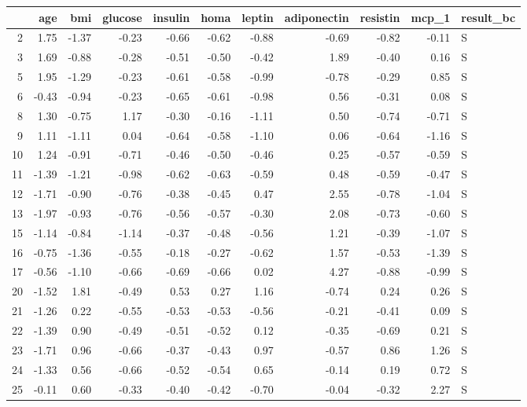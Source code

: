 \begin{table}[ht]
\centering
\begin{tabular}{rrrrrrrrrrl}
  \hline
 & age & bmi & glucose & insulin & homa & leptin & adiponectin & resistin & mcp\_1 & result\_bc \\ 
  \hline
2 & 1.75 & -1.37 & -0.23 & -0.66 & -0.62 & -0.88 & -0.69 & -0.82 & -0.11 & S \\ 
  3 & 1.69 & -0.88 & -0.28 & -0.51 & -0.50 & -0.42 & 1.89 & -0.40 & 0.16 & S \\ 
  5 & 1.95 & -1.29 & -0.23 & -0.61 & -0.58 & -0.99 & -0.78 & -0.29 & 0.85 & S \\ 
  6 & -0.43 & -0.94 & -0.23 & -0.65 & -0.61 & -0.98 & 0.56 & -0.31 & 0.08 & S \\ 
  8 & 1.30 & -0.75 & 1.17 & -0.30 & -0.16 & -1.11 & 0.50 & -0.74 & -0.71 & S \\ 
  9 & 1.11 & -1.11 & 0.04 & -0.64 & -0.58 & -1.10 & 0.06 & -0.64 & -1.16 & S \\ 
  10 & 1.24 & -0.91 & -0.71 & -0.46 & -0.50 & -0.46 & 0.25 & -0.57 & -0.59 & S \\ 
  11 & -1.39 & -1.21 & -0.98 & -0.62 & -0.63 & -0.59 & 0.48 & -0.59 & -0.47 & S \\ 
  12 & -1.71 & -0.90 & -0.76 & -0.38 & -0.45 & 0.47 & 2.55 & -0.78 & -1.04 & S \\ 
  13 & -1.97 & -0.93 & -0.76 & -0.56 & -0.57 & -0.30 & 2.08 & -0.73 & -0.60 & S \\ 
  15 & -1.14 & -0.84 & -1.14 & -0.37 & -0.48 & -0.56 & 1.21 & -0.39 & -1.07 & S \\ 
  16 & -0.75 & -1.36 & -0.55 & -0.18 & -0.27 & -0.62 & 1.57 & -0.53 & -1.39 & S \\ 
  17 & -0.56 & -1.10 & -0.66 & -0.69 & -0.66 & 0.02 & 4.27 & -0.88 & -0.99 & S \\ 
  20 & -1.52 & 1.81 & -0.49 & 0.53 & 0.27 & 1.16 & -0.74 & 0.24 & 0.26 & S \\ 
  21 & -1.26 & 0.22 & -0.55 & -0.53 & -0.53 & -0.56 & -0.21 & -0.41 & 0.09 & S \\ 
  22 & -1.39 & 0.90 & -0.49 & -0.51 & -0.52 & 0.12 & -0.35 & -0.69 & 0.21 & S \\ 
  23 & -1.71 & 0.96 & -0.66 & -0.37 & -0.43 & 0.97 & -0.57 & 0.86 & 1.26 & S \\ 
  24 & -1.33 & 0.56 & -0.66 & -0.52 & -0.54 & 0.65 & -0.14 & 0.19 & 0.72 & S \\ 
  25 & -0.11 & 0.60 & -0.33 & -0.40 & -0.42 & -0.70 & -0.04 & -0.32 & 2.27 & S \\ 

\end{tabular}
\end{table}
